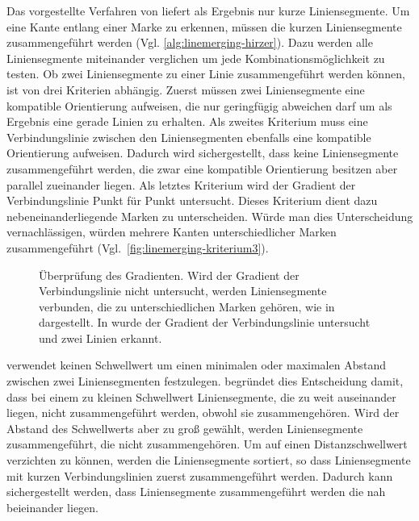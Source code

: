 Das vorgestellte Verfahren von \citeauthor{clarke96} liefert als Ergebnis nur kurze Liniensegmente. Um eine Kante
 entlang einer Marke zu erkennen, müssen die kurzen Liniensegmente zusammengeführt werden
 (Vgl. \autoref{alg:linemerging-hirzer}). Dazu werden alle Liniensegmente miteinander verglichen um jede
 Kombinationsmöglichkeit zu testen. Ob zwei Liniensegmente zu einer Linie zusammengeführt werden können, ist von drei
 Kriterien abhängig. Zuerst müssen zwei Liniensegmente eine kompatible Orientierung aufweisen, die nur geringfügig
 abweichen darf um als Ergebnis eine gerade Linien zu erhalten. Als zweites Kriterium muss eine Verbindungslinie
 zwischen den Liniensegmenten ebenfalls eine kompatible Orientierung aufweisen. Dadurch wird sichergestellt, dass keine
 Liniensegmente zusammengeführt werden, die zwar eine kompatible Orientierung besitzen aber parallel zueinander liegen.
 Als letztes Kriterium wird der Gradient der Verbindungslinie Punkt für Punkt untersucht. Dieses Kriterium dient dazu
 nebeneinanderliegende Marken zu unterscheiden. Würde man dies Unterscheidung vernachlässigen, würden mehrere Kanten
 unterschiedlicher Marken zusammengeführt (Vgl.~\autoref{fig:linemerging-kriterium3}).

\begin{figure}[!ht]
	\centering
	\caption{Überprüfung des Gradienten. Wird der Gradient der Verbindungslinie nicht untersucht, werden Liniensegmente
	 verbunden, die zu unterschiedlichen Marken gehören, wie in  dargestellt. In
	  wurde der Gradient der Verbindungslinie untersucht und zwei Linien erkannt.}
	\label{fig:linemerging-kriterium3}
\end{figure}

\citeauthor{hirzer08} verwendet keinen Schwellwert um einen minimalen oder maximalen Abstand zwischen zwei
 Liniensegmenten festzulegen. \citeauthor{hirzer08} begründet dies Entscheidung damit, dass bei einem zu kleinen
 Schwellwert Liniensegmente, die zu weit auseinander liegen, nicht zusammengeführt werden, obwohl sie zusammengehören.
 Wird der Abstand des Schwellwerts aber zu groß gewählt, werden Liniensegmente zusammengeführt, die nicht
 zusammengehören. Um auf einen Distanzschwellwert verzichten zu können, werden die Liniensegmente sortiert, so dass
 Liniensegmente mit kurzen Verbindungslinien zuerst zusammengeführt werden. Dadurch kann sichergestellt werden, dass
 Liniensegmente zusammengeführt werden die nah beieinander liegen.


